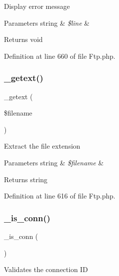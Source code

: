 Display error message


\begin{DoxyParams}[1]{Parameters}
string & {\em \$line} & \\
\hline
\end{DoxyParams}
\begin{DoxyReturn}{Returns}
void 
\end{DoxyReturn}


Definition at line 660 of file Ftp.\+php.

\mbox{\label{class_c_i___f_t_p_ab06ef33f96f03cafbb8f2bb6d695ef1f}} 
\subsubsection{\texorpdfstring{\_getext()}{\_getext()}}
{\footnotesize\ttfamily \+\_\+getext (\begin{DoxyParamCaption}\item[{}]{\$filename }\end{DoxyParamCaption})\hspace{0.3cm}{\ttfamily [protected]}}

Extract the file extension


\begin{DoxyParams}[1]{Parameters}
string & {\em \$filename} & \\
\hline
\end{DoxyParams}
\begin{DoxyReturn}{Returns}
string 
\end{DoxyReturn}


Definition at line 616 of file Ftp.\+php.

\mbox{\label{class_c_i___f_t_p_af20c08e4b61fe028e032b388cd73936a}} 
\subsubsection{\texorpdfstring{\_is\_conn()}{\_is\_conn()}}
{\footnotesize\ttfamily \+\_\+is\+\_\+conn (\begin{DoxyParamCaption}{ }\end{DoxyParamCaption})\hspace{0.3cm}{\ttfamily [protected]}}

Validates the connection ID

